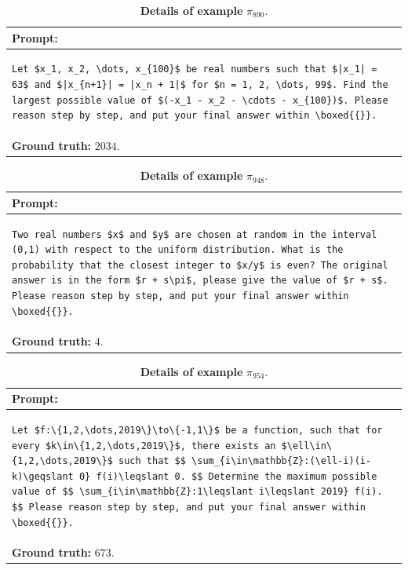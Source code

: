 \begin{table}[htbp]
\centering
\caption{\textbf{Details of example} $\pi_{890}$.}
\begin{tabular}{p{}}
\toprule
\textbf{Prompt:} \\
\midrule
\footnotesize
\begin{lstlisting}[breaklines=true, basicstyle=\ttfamily, aboveskip=-1.0em, belowskip=0pt, breakindent=0pt]
Let $x_1, x_2, \dots, x_{100}$ be real numbers such that $|x_1| = 63$ and $|x_{n+1}| = |x_n + 1|$ for $n = 1, 2, \dots, 99$. Find the largest possible value of $(-x_1 - x_2 - \cdots - x_{100})$. Please reason step by step, and put your final answer within \boxed{{}}.
\end{lstlisting} \\
\midrule
\textbf{Ground truth:} $2034$. \\
\bottomrule
\end{tabular}
\end{table}


\begin{table}[htbp]
\centering
\caption{\textbf{Details of example} $\pi_{948}$.}
\begin{tabular}{p{}}
\toprule
\textbf{Prompt:} \\
\midrule
\footnotesize
\begin{lstlisting}[breaklines=true, basicstyle=\ttfamily, aboveskip=-1.0em, belowskip=0pt, breakindent=0pt]
Two real numbers $x$ and $y$ are chosen at random in the interval (0,1) with respect to the uniform distribution. What is the probability that the closest integer to $x/y$ is even? The original answer is in the form $r + s\pi$, please give the value of $r + s$.  Please reason step by step, and put your final answer within \boxed{{}}.
\end{lstlisting} \\
\midrule
\textbf{Ground truth:} $4$. \\
\bottomrule
\end{tabular}
\end{table}


\begin{table}[htbp]
\centering
\caption{\textbf{Details of example} $\pi_{954}$.}
\begin{tabular}{p{}}
\toprule
\textbf{Prompt:} \\
\midrule
\footnotesize
\begin{lstlisting}[breaklines=true, basicstyle=\ttfamily, aboveskip=-1.0em, belowskip=0pt, breakindent=0pt]
Let $f:\{1,2,\dots,2019\}\to\{-1,1\}$ be a function, such that for every $k\in\{1,2,\dots,2019\}$, there exists an $\ell\in\{1,2,\dots,2019\}$ such that $$ \sum_{i\in\mathbb{Z}:(\ell-i)(i-k)\geqslant 0} f(i)\leqslant 0. $$ Determine the maximum possible value of $$ \sum_{i\in\mathbb{Z}:1\leqslant i\leqslant 2019} f(i). $$ Please reason step by step, and put your final answer within \boxed{{}}.
\end{lstlisting} \\
\midrule
\textbf{Ground truth:} $673$. \\
\bottomrule
\end{tabular}
\end{table}


